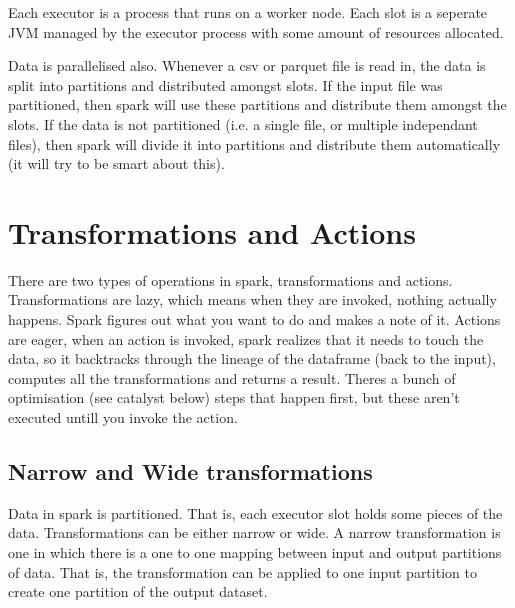 \documentclass{article}
\begin{document}
Each executor is a process that runs on a worker node. Each slot is a seperate JVM managed by the executor process with some amount of resources allocated. 

Data is parallelised also. Whenever a csv or parquet file is read in, the data is split into partitions and distributed amongst slots. If the input file was partitioned, then spark will use these partitions and distribute them amongst the slots. If the data is not partitioned (i.e. a single file, or multiple independant files), then spark will divide it into partitions and distribute them automatically (it will try to be smart about this).


\section{Transformations and Actions}
There are two types of operations in spark, transformations and actions. Transformations are lazy, which means when they are invoked, nothing actually happens. Spark figures out what you want to do and makes a note of it. Actions are eager, when an action is invoked, spark realizes that it needs to touch the data, so it backtracks through the lineage of the dataframe (back to the input), computes all the transformations and returns a result. Theres a bunch of optimisation (see catalyst below) steps that happen first, but these aren't executed untill you invoke the action.

\subsection{Narrow and Wide transformations}
Data in spark is partitioned. That is, each executor slot holds some pieces of the data. Transformations can be either narrow or wide. A narrow transformation is one in which there is a one to one mapping between input and output partitions of data. That is, the transformation can be applied to one input partition to create one partition of the output dataset. 
\end{document}
